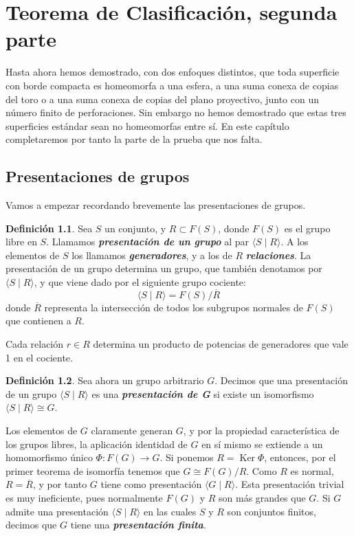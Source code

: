 \documentclass[10pt]{report}
\DeclareMathOperator{\Ker}{Ker}
\newcommand{\enfatiza}[1]{\textbf{\textit{#1}}}
\theoremstyle{definition}
\newtheorem{defin}{Definición}[section]
\begin{document}
\chapter{Teorema de Clasificación, segunda parte}
Hasta ahora hemos demostrado, con dos enfoques distintos, que toda superficie con borde compacta es homeomorfa a una esfera, a una suma conexa de copias del toro o a una suma conexa de copias del plano proyectivo, junto con un número finito de perforaciones. Sin embargo no hemos demostrado que estas tres superficies estándar sean no homeomorfas entre sí. En este capítulo completaremos por tanto la parte de la prueba que nos falta. 

\section{Presentaciones de grupos}
Vamos a empezar recordando brevemente las presentaciones de grupos. 

\begin{defin}
Sea $S$ un conjunto, y $R\subset F(S)$, donde $F(S)$ es el grupo libre en $S$. Llamamos \enfatiza{presentación de un grupo} al par $\langle S \mid R\rangle$. A los elementos de $S$ los llamamos \enfatiza{generadores}, y a los de $R$ \enfatiza{relaciones}. La presentación de un grupo determina un grupo, que también denotamos por $\langle S \mid R \rangle$, y que viene dado por el siguiente grupo cociente: 
\[
\langle S\mid R\rangle = F(S)/\overline{R}
\]
donde $\overline{R}$ representa la intersección de todos los subgrupos normales de $F(S)$ que contienen a $R$.
\end{defin}
Cada relación $r\in R$ determina un producto de potencias de generadores que vale 1 en el cociente.
\begin{defin}
Sea ahora un grupo arbitrario $G$. Decimos que una presentación de un grupo $\langle S \mid R \rangle$ es una \enfatiza{presentación de G} si existe un isomorfismo $\langle S \mid R\rangle \cong G$. 
\end{defin}
Los elementos de $G$ claramente generan $G$, y por la propiedad característica de los grupos libres, la aplicación identidad de $G$ en sí mismo se extiende a un homomorfismo único $\Phi: F(G) \to G$. Si ponemos $R= \Ker{\Phi}$, entonces, por el primer teorema de isomorfía tenemos que $G\cong F(G)/R$. Como $R$ es normal, $R=\overline{R}$, y por tanto $G$ tiene como presentación $\langle G\mid R\rangle$. Esta presentación trivial es muy ineficiente, pues normalmente $F(G)$ y $R$ son más grandes que $G$. 
Si $G$ admite una presentación $\langle S\mid R	\rangle$ en las cuales $S$ y $R$ son conjuntos finitos, decimos que $G$ tiene una \enfatiza{presentación finita}.
\end{document}
